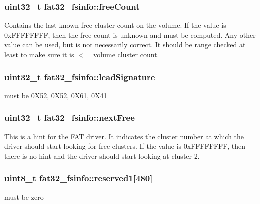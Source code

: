 \subsubsection[{\texorpdfstring{free\+Count}{freeCount}}]{\setlength{\rightskip}{0pt plus 5cm}uint32\+\_\+t fat32\+\_\+fsinfo\+::free\+Count}\hypertarget{structfat32__fsinfo_a6c2d84388c0a38a74f7682fd602492c7}{}\label{structfat32__fsinfo_a6c2d84388c0a38a74f7682fd602492c7}
Contains the last known free cluster count on the volume. If the value is 0x\+F\+F\+F\+F\+F\+F\+FF, then the free count is unknown and must be computed. Any other value can be used, but is not necessarily correct. It should be range checked at least to make sure it is $<$= volume cluster count. 
\subsubsection[{\texorpdfstring{lead\+Signature}{leadSignature}}]{\setlength{\rightskip}{0pt plus 5cm}uint32\+\_\+t fat32\+\_\+fsinfo\+::lead\+Signature}\hypertarget{structfat32__fsinfo_aa8ee056cc1beb1355e15610c1beba5e3}{}\label{structfat32__fsinfo_aa8ee056cc1beb1355e15610c1beba5e3}
must be 0\+X52, 0\+X52, 0\+X61, 0\+X41 
\subsubsection[{\texorpdfstring{next\+Free}{nextFree}}]{\setlength{\rightskip}{0pt plus 5cm}uint32\+\_\+t fat32\+\_\+fsinfo\+::next\+Free}\hypertarget{structfat32__fsinfo_a539b3bb0a2ead9df417df9ac8b6b1606}{}\label{structfat32__fsinfo_a539b3bb0a2ead9df417df9ac8b6b1606}
This is a hint for the F\+AT driver. It indicates the cluster number at which the driver should start looking for free clusters. If the value is 0x\+F\+F\+F\+F\+F\+F\+FF, then there is no hint and the driver should start looking at cluster 2. 
\subsubsection[{\texorpdfstring{reserved1}{reserved1}}]{\setlength{\rightskip}{0pt plus 5cm}uint8\+\_\+t fat32\+\_\+fsinfo\+::reserved1\mbox{[}480\mbox{]}}\hypertarget{structfat32__fsinfo_ac24bd4801a60a54e5133ed1bb71bcdaa}{}\label{structfat32__fsinfo_ac24bd4801a60a54e5133ed1bb71bcdaa}
must be zero 
